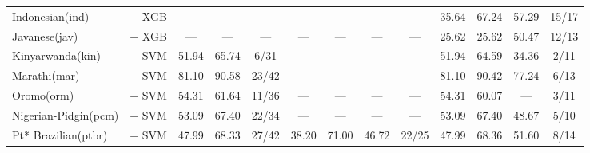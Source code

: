 \begin{table*}[h]
{\begin{tabular}{l|c|ccc|cccc|cccc}
            Indonesian(ind)      & \citep{wang2024multilingual}   + XGB                                   & —                            & —                            & —                           & —             & —             & —                 & —             & 35.64         & 67.24         & 57.29             & 15/17         \\
            Javanese(jav)        & \citep{wang2024multilingual}   + XGB                                   & —                            & —                            & —                           & —             & —             & —                 & —             & 25.62         & 25.62         & 50.47             & 12/13         \\
            Kinyarwanda(kin)     & \citep{wang2024multilingual}  + SVM                                    & 51.94                        & 65.74                        & 6/31                        & —             & —             & —                 & —             & 51.94         & 64.59         & 34.36             & 2/11          \\
            Marathi(mar)         & \citep{wang2024multilingual}   + SVM                                   & 81.10                        & 90.58                        & 23/42                       & —             & —             & —                 & —             & 81.10         & 90.42         & 77.24             & 6/13          \\
            Oromo(orm)           & \citep{wang2024multilingual}    + SVM                                  & 54.31                        & 61.64                        & 11/36                       & —             & —             & —                 & —             & 54.31         & 60.07         & —                 & 3/11          \\
            Nigerian-Pidgin(pcm) & \citep{wang2024multilingual}   + SVM                                   & 53.09                        & 67.40                        & 22/34                       & —             & —             & —                 & —             & 53.09         & 67.40         & 48.67             & 5/10          \\
            Pt* Brazilian(ptbr)  & \citep{souza2020bertimbau} + SVM                                       & 47.99                        & 68.33                        & 27/42                       & 38.20         & 71.00         & 46.72             & 22/25         & 47.99         & 68.36         & 51.60             & 8/14          \\

\end{tabular}}
\end{table*}
